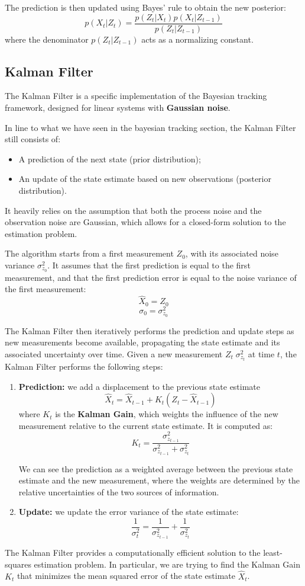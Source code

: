 The prediction is then updated using Bayes' rule to obtain the new posterior:
\[ p(X_t | Z_{t}) = \frac{p(Z_t | X_t) p(X_t | Z_{t-1})} {p(Z_t | Z_{t-1})} \]
where the denominator $p(Z_t | Z_{t-1})$ acts as a normalizing constant.

\subsection{Kalman Filter}
The Kalman Filter is a specific implementation of the Bayesian tracking framework, designed for linear systems with \textbf{Gaussian noise}.

In line to what we have seen in the bayesian tracking section, the Kalman Filter still consists of:
\begin{itemize}
    \item A prediction of the next state (prior distribution);
    \item An update of the state estimate based on new observations (posterior distribution).
\end{itemize}
It heavily relies on the assumption that both the process noise and the observation noise are Gaussian, 
which allows for a closed-form solution to the estimation problem.

The algorithm starts from a first measurement $Z_0$, with its associated noise variance $\sigma_{z_0}^2$.
It assumes that the first prediction is equal to the first measurement, and that the first prediction error is equal to the noise variance of the first measurement:
\[ \hat{X}_0 = Z_0 \]
\[ \sigma_0 = \sigma_{z_0}^2 \]

The Kalman Filter then iteratively performs the prediction and update steps as new measurements become available,
propagating the state estimate and its associated uncertainty over time.
Given a new measurement $Z_t \; \sigma_{z_t}^2$ at time $t$, the Kalman Filter performs the following steps:
\begin{enumerate}
    \item \textbf{Prediction:} we add a displacement to the previous state estimate
    \[ \hat{X}_t = \hat{X}_{t-1} + K_t (Z_t - \hat{X}_{t-1}) \]
    where $K_t$ is the \textbf{Kalman Gain}, which weights the influence of the new measurement 
    relative to the current state estimate. It is computed as:
    \[ K_t = \frac{\sigma_{z_{t-1}}^2}{\sigma_{z_{t-1}}^2 + \sigma_{z_t}^2} \]

    We can see the prediction as a weighted average between the previous state estimate and the new measurement, 
    where the weights are determined by the relative uncertainties of the two sources of information.
     
    \item \textbf{Update:} we update the error variance of the state estimate:
    \[ \frac{1}{\sigma_t^2} = \frac{1}{\sigma_{z_{t-1}}^2} + \frac{1}{\sigma_{z_t}^2} \]
\end{enumerate}
The Kalman Filter provides a computationally efficient solution to the least-squares estimation problem. In particular,
we are trying to find the Kalman Gain $K_t$ that minimizes the mean squared error of the state estimate $\hat{X}_t$.


